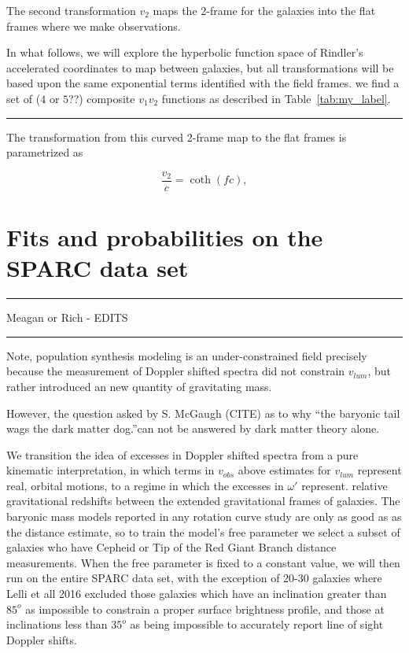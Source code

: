 \documentclass[reprint,%
 amsmath,amssymb,
 aps,
]{revtex4-1}
\begin{document}
 
 
 
 The second transformation  $v_2$ maps the 2-frame for the galaxies into the flat frames where we make observations. 



In what follows, we will explore the hyperbolic function space of  Rindler's accelerated coordinates to map between galaxies, but all transformations will be based upon the same exponential terms identified with the field frames.
 we find a set of ($4$ or $5$??) composite $v_1 v_2$ functions as described in Table~\ref{tab:my_label}.
{\color{pink} \rule{\linewidth}{0.5mm}}


  
  The transformation from this curved 2-frame map to the flat frames is parametrized as 
  
   
  
  \begin{equation}
\frac{v_{2} }{c}=  \coth (fc),
\label{eq:hyperbolico}
\end{equation}


%


  
\section{Fits and probabilities on  the SPARC data set  }
 {\color{red} \rule{\linewidth}{0.5mm}}
 
 {\color{red}Meagan or Rich - EDITS}
 {\color{red} \rule{\linewidth}{0.5mm}}
 
  Note,  population synthesis modeling  is an under-constrained field  precisely because the measurement of Doppler shifted spectra did not constrain $v_{lum}$, but rather introduced    an   new quantity of gravitating mass. 
 
    
However, the question  asked by S. McGaugh (CITE) as to why  ``the   baryonic tail wags the dark matter dog.''can not be answered by dark matter theory alone. 



We transition the idea of excesses in Doppler shifted spectra from a  pure kinematic interpretation, in which terms in  $v_{obs}$ above estimates for  $v_{lum}$ represent real, orbital motions, to a regime in which the excesses in $\omega'$ represent.
  relative gravitational redshifts between the extended gravitational  frames of  galaxies. 
 The baryonic mass models reported in any rotation curve study are only as good as    as the distance estimate, so to train the model's free parameter we select a subset of galaxies who have Cepheid or Tip of the Red Giant Branch distance measurements.  When the free parameter is fixed to a constant value, we will then run on the entire SPARC data set, with the exception of 20-30 galaxies where Lelli et all 2016 excluded those galaxies which have an inclination greater than $85^o$ as impossible to constrain a proper surface brightness profile, and those at inclinations less than $35^o$ as being impossible to accurately report line of sight Doppler shifts.   
 
\end{document}
